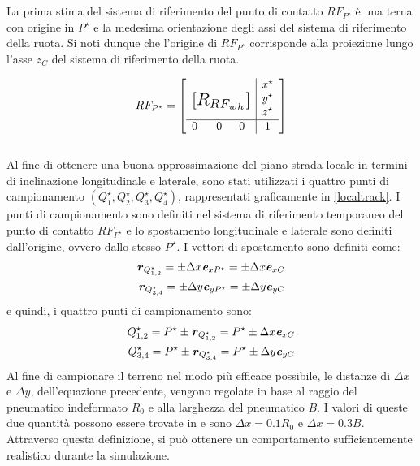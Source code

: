 La prima stima del sistema di riferimento del punto di contatto $RF_{P^\star}$ è una terna con origine in $P^\star$ e la medesima orientazione degli assi del sistema di riferimento della ruota. Si noti dunque che l'origine di $RF_{P^\star}$ corrisponde alla proiezione lungo l'asse $z_C$ del sistema di riferimento della ruota.

\begin{equation}
RF_{P^\star} = \left[
\begin{array}{ccc|c}
& & & x^\star\\
\multicolumn{3}{c|}{\multirow{3}{*}{\raisebox{20mm}{\scalebox{1.5}{$[R_{RF_{wh}}]$}}}} & y^\star\\
& & & z^\star\\ \hline
0 & ~~0 & 0 & 1
\end{array}\right]
\end{equation}\\

Al fine di ottenere una buona approssimazione del piano strada locale in termini di inclinazione longitudinale e laterale, sono stati utilizzati i quattro punti di campionamento $(Q^\star_1, Q^\star_2, Q^\star_3, Q^\star_4)$, rappresentati graficamente in \figurename{ \ref{localtrack}}. I punti di campionamento sono definiti nel sistema di riferimento temporaneo del punto di contatto $RF_{P^\star}$ e lo spostamento longitudinale e laterale sono definiti dall'origine, ovvero dallo stesso $P^\star$. I vettori di spostamento sono definiti come:
%
\begin{equation}
\begin{split}
\textbf{\textit{r}}_{Q^\star_{1,2}} = \pm \Delta x \textbf{\textit{e}}_{xP^\star} = \pm \Delta x \textbf{\textit{e}}_{xC} \\
\textbf{\textit{r}}_{Q^\star_{3,4}} = \pm \Delta y \textbf{\textit{e}}_{yP^\star} = \pm \Delta y \textbf{\textit{e}}_{yC}
\end{split}
\end{equation}
%
e quindi, i quattro punti di campionamento sono:
%
\begin{equation}
\begin{split}
Q^\star_{1,2} = P^\star \pm \textbf{\textit{r}}_{Q^\star_{1,2}} = P^\star \pm \Delta x \textbf{\textit{e}}_{xC} \\
Q^\star_{3,4} = P^\star \pm \textbf{\textit{r}}_{Q^\star_{3,4}} = P^\star \pm \Delta y \textbf{\textit{e}}_{yC}
\end{split}
\end{equation}
%
Al fine di campionare il terreno nel modo più efficace possibile, le distanze di $\Delta x$ e $\Delta y$, dell'equazione precedente, vengono regolate in base al raggio del pneumatico indeformato $R_0$ e alla larghezza del pneumatico $B$. I valori di queste due quantità possono essere trovate in \cite{Rill} e sono $\Delta x = 0.1 R_0$ e $\Delta x = 0.3 B$. Attraverso questa definizione, si può ottenere un comportamento sufficientemente realistico durante la simulazione.

